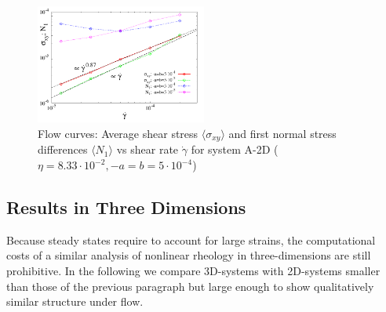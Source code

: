 \documentclass[8.5pt,twoside,twocolumn]{article}
\begin{document}
\begin{figure}[htp!]
\centering
\includegraphics[angle=0,width=0.5\textwidth]{S_xy_N1_gammadot.pdf}
\caption{Flow curves: Average shear stress $\langle \sigma_{xy}\rangle$ and first normal stress differences $\langle N_1 \rangle$ vs shear rate $\dot{\gamma}$ for system A-2D ($\eta=8.33\cdot10^{-2}, -a=b=5\cdot 10^{-4}$)} 
\label{fig11}
\end{figure}

\subsection*{Results in Three Dimensions}

Because steady states require to account for large strains, the computational costs of a similar analysis of nonlinear rheology in three-dimensions are still prohibitive.
In the following we compare 3D-systems with 2D-systems smaller than those of the previous paragraph but large enough to show qualitatively similar structure under flow.
\end{document}
